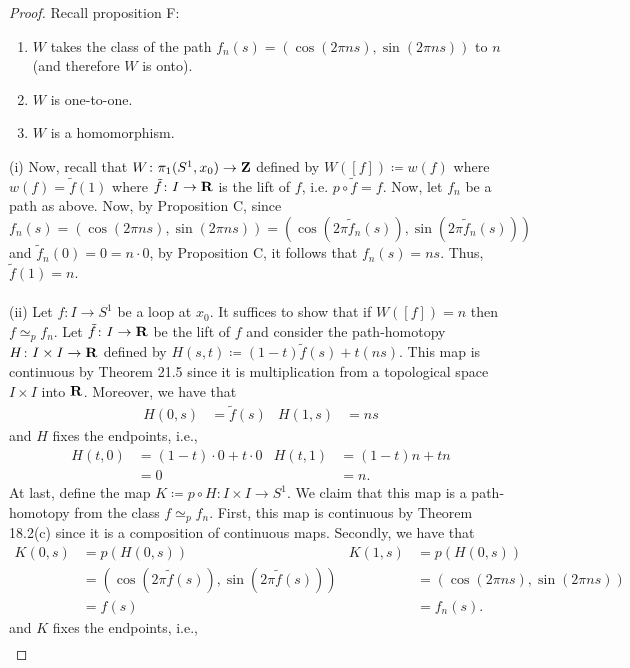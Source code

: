 \begin{proof}
Recall proposition F:
\begin{proposition*}[F]
\begin{enumerate}[label={\normalfont(\roman*)}]
\item $W$ takes the class of the path $f_n(s)=(\cos(2\pi ns),\sin(2\pi
  ns))$ to $n$ (and therefore $W$ is onto).
\item $W$ is one-to-one.
\item $W$ is a homomorphism.
\end{enumerate}
\end{proposition*}
(i) Now, recall that $W\colon\pi_1(S^1,x_0)\to\mathbf{Z}$ defined by
$W([f])\coloneqq w(f)$ where $w(f)=\tilde f(1)$ where $\tilde f\colon
I\to\mathbf{R}$ is the lift of $f$, i.e. $p\circ \tilde f=f$. Now, let $f_n$ be a
path as above. Now, by Proposition C, since
\[
f_n(s)=(\cos(2\pi ns),\sin(2\pi ns))=(\cos(2\pi\tilde
f_n(s)),\sin(2\pi\tilde f_n(s)))
\]
and $\tilde f_n(0)=0=n\cdot 0$, by Proposition C, it follows that
$f_n(s)=ns$. Thus, $\tilde f(1)=n$.
\\\\
(ii) Let $f\colon I\to S^1$ be a loop at $x_0$. It suffices to show that if
$W([f])=n$ then $f\simeq_p f_n$. Let $\tilde f\colon I\to\mathbf{R}$ be the lift
of $f$ and consider the path-homotopy $H\colon I\times I\to\mathbf{R}$ defined by
$H(s,t)\coloneqq (1-t)\tilde f(s)+t(ns)$. This map is continuous by
Theorem 21.5 since it is multiplication from a topological space $I\times
I$ into $\mathbf{R}$. Moreover, we have that
\begin{align*}
H(0,s)&=\tilde f(s)&H(1,s)&=ns
\end{align*}
and $H$ fixes the endpoints, i.e.,
\begin{align*}
H(t,0)&=(1-t)\cdot 0+t\cdot 0&
H(t,1)&=(1-t)n+tn\\
&=0&
&=n.
\end{align*}
At last, define the map $K\coloneqq p\circ H\colon I\times I\to S^1$. We
claim that this map is a path-homotopy from the class $f\simeq_p
f_n$. First, this map is continuous by Theorem 18.2(c) since it is a
composition of continuous maps. Secondly, we have that
\begin{align*}
K(0,s)&=p(H(0,s))&
K(1,s)&=p(H(0,s))\\
&=(\cos(2\pi\tilde f(s)),\sin(2\pi\tilde f(s)))&
&=(\cos(2\pi ns),\sin(2\pi ns))\\
&=f(s)&
&=f_n(s).
\end{align*}
and $K$ fixes the endpoints, i.e.,
\begin{align*}

\end{align*}
\end{proof}
